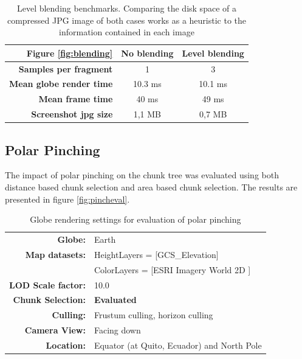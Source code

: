 \begin{table}
\centering
\caption[]{Level blending benchmarks. Comparing the disk space of a compressed JPG image of both cases works as a heuristic to the information contained in each image}
  \label{table:resultblending}
  \begin{tabular}{| r | c c |}
    \hline
      \textbf{Figure \ref{fig:blending}}  & \textbf{No blending} & \textbf{Level blending} \\ \hline
      \textbf{Samples per fragment} & 1 & 3 \\ 
      \textbf{Mean globe render time}  & 10.3 ms & 10.1 ms \\ 
      \textbf{Mean frame time}  & 40 ms &  49 ms \\ 
      \textbf{Screenshot jpg size} & 1,1 MB & 0,7 MB \\
    \hline
  \end{tabular}
\end{table}

\clearpage
\subsection{Polar Pinching}
\label{section:res_polarpinching}
\FloatBarrier
The impact of polar pinching on the chunk tree was evaluated using both distance based chunk selection and area based chunk selection. The results are presented in figure \ref{fig:pincheval}.

\begin{table}[h]
  \centering
  \caption[]{Globe rendering settings for evaluation of polar pinching}
  \label{table:pinchingstart}
  \begin{tabular}{| r l |}
    \hline
      \textbf{Globe:}             & Earth \\
      \textbf{Map datasets:}      & HeightLayers = [GCS\_Elevation\cite{worldelevation3d}] \\
                                  & ColorLayers = [ESRI Imagery World 2D \cite{imageryworld2d}] \\
      \textbf{LOD Scale factor:}  & 10.0 \\
      \textbf{Chunk Selection:}    & \textbf{Evaluated} \\
      \textbf{Culling:}           & Frustum culling, horizon culling \\
      \textbf{Camera View:}       & Facing down\\
      \textbf{Location:}          & Equator (at Quito, Ecuador) and North Pole\\
    \hline
  \end{tabular}
\end{table}

